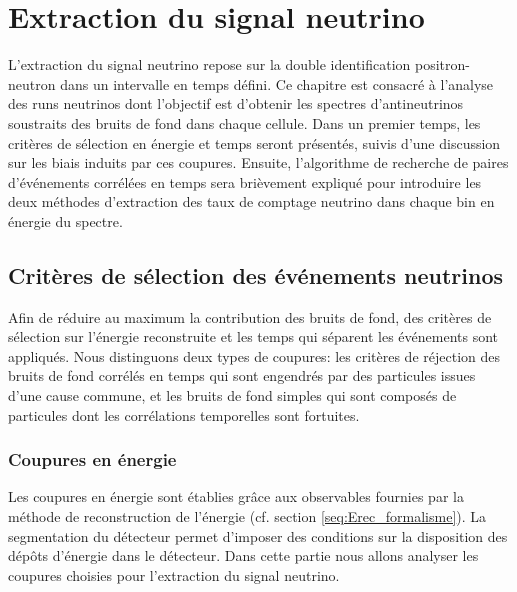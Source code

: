 

\chapter{Extraction du signal neutrino}
\label{chap:chapitre_analysie}

\minitoc

\newpage

L'extraction du signal neutrino repose sur la double identification positron-neutron dans un intervalle en temps défini. Ce chapitre est consacré à l'analyse des runs neutrinos dont l'objectif est d'obtenir les spectres d'antineutrinos soustraits des bruits de fond dans chaque cellule. Dans un premier temps, les critères de sélection en énergie et temps seront présentés, suivis d'une discussion sur les biais induits par ces coupures. Ensuite, l'algorithme de recherche de paires d'événements corrélées en temps sera brièvement expliqué pour introduire les deux méthodes d'extraction des taux de comptage neutrino dans chaque bin en énergie du spectre.\\

\section{Critères de sélection des événements neutrinos}
\label{sec:cuts}

Afin de réduire au maximum la contribution des bruits de fond, des critères de sélection sur l'énergie reconstruite et les temps qui séparent les événements sont appliqués. Nous distinguons deux types de coupures: les critères de réjection des bruits de fond corrélés en temps qui sont engendrés par des particules issues d'une cause commune, et les bruits de fond simples qui sont composés de particules dont les corrélations temporelles sont fortuites.

\bigbreak

\subsection{Coupures en énergie}
\label{sec:energy_cuts}

Les coupures en énergie sont établies grâce aux observables fournies par la méthode de reconstruction de l'énergie (cf. section \ref{seq:Erec_formalisme}). La segmentation du détecteur permet d'imposer des conditions sur la disposition des dépôts d'énergie dans le détecteur. Dans cette partie nous allons analyser les coupures choisies pour l'extraction du signal neutrino.\\

